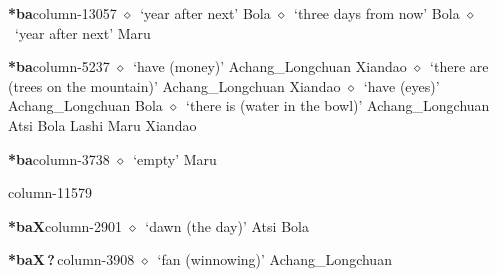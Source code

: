   \item {\footnotesize \textbf{*ba}}{\tiny column-13057}
         $\diamond$~`year after next'
         Bola 
\hspace{1ex}
         $\diamond$~`three days from now'
         Bola 
\hspace{1ex}
         $\diamond$~`year after next'
         Maru 
  \item {\footnotesize \textbf{*ba}}{\tiny column-5237}
         $\diamond$~`have (money)'
         Achang\_Longchuan 
\hspace{1ex}
         Xiandao 
\hspace{1ex}
         $\diamond$~`there are (trees on the mountain)'
         Achang\_Longchuan 
\hspace{1ex}
         Xiandao 
\hspace{1ex}
         $\diamond$~`have (eyes)'
         Achang\_Longchuan 
\hspace{1ex}
         Bola 
\hspace{1ex}
         $\diamond$~`there is (water in the bowl)'
         Achang\_Longchuan 
\hspace{1ex}
         Atsi 
\hspace{1ex}
         Bola 
\hspace{1ex}
         Lashi 
\hspace{1ex}
         Maru 
\hspace{1ex}
         Xiandao 
  \item {\footnotesize \textbf{*ba}}{\tiny column-3738}
         $\diamond$~`empty'
         Maru 
  \item {\footnotesize \textbf{}}{\tiny column-11579}
  \item {\footnotesize \textbf{*baX}}{\tiny column-2901}
         $\diamond$~`dawn (the day)'
         Atsi 
\hspace{1ex}
         Bola 
  \item {\footnotesize \textbf{*baX\,?\,}}{\tiny column-3908}
         $\diamond$~`fan (winnowing)'
         Achang\_Longchuan 
